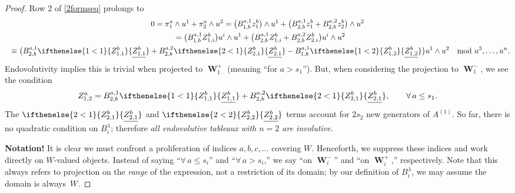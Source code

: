 \documentclass[11pt]{article}
\numberwithin{equation}{section}
\DeclareMathOperator{\Wu}{\mathbf{W}}
\newcommand{\Z}[3]{\ifthenelse{#1<#2}{\ensuremath{Z^{#3}_{#1,#2}}}{\ensuremath{\underline{Z^{#3}_{#1,#2}}}}}
\begin{document}
\begin{proof}
Row 2 of \eqref{2formseq} prolongs to
\begin{gather*}
0 = \pi^a_1 \wedge u^1 + \pi^a_2 \wedge u^2
  =
    \big( B^{a,1}_{1,b} z^b_1 \big)\wedge u^1
   +\big( B^{a,1}_{2,b} z^b_1
         + B^{a,2}_{2,b} z^b_2 \big)\wedge u^2\\
\hphantom{0}{} =
    \big( B^{a,1}_{1,b} Z^b_{1,i} \big)u^i\wedge u^1
   +\big( B^{a,1}_{2,b} Z^b_{1,i}
         + B^{a,2}_{2,b} Z^b_{2,i} \big)u^i\wedge u^2\\
\hphantom{0}{}
\equiv
    \big( B^{a,1}_{2,b} \Z{1}{1}{b}
         + B^{a,2}_{2,b} \Z{2}{1}{b}
         - B^{a,1}_{1,b} \Z{1}{2}{b}
         \big)u^1\wedge u^2 \ \mod u^3, \ldots, u^n.
\end{gather*}
Endovolutivity implies this is trivial when projected to $\Wu^+_1$ (meaning
``for $a > s_1$''). But, when considering the projection to $\Wu^-_1$, we see
the condition
\begin{gather*}
Z^a_{1,2} =  B^{a,1}_{2,b}\Z{1}{1}{b} +
B^{a,2}_{2,b}\Z{2}{1}{b},\qquad \forall\, a \leq s_1.
\end{gather*}
The $\Z{2}{1}{b}$ and $\Z{2}{2}{b}$ terms account for
$2s_2$ new generators of $A^{(1)}$.  So far, there is no quadratic condition on
$B^\lambda_i$; therefore \emph{all endovolutive tableaux with $n=2$ are
involutive.}

\textbf{Notation!}  It is clear we must confront a proliferation of indices
$a,b,c,\ldots$ covering $W$.  Henceforth, we suppress these indices and work
directly on $W$-valued objects.  Instead of saying ``$\forall\,
a\leq s_i$'' and ``$\forall\, a > s_i$,'' we say ``on $\Wu^-_i$'' and ``on
$\Wu^+_i$,'' respectively.  Note that this always refers to
projection on the \emph{range} of the expression, not a restriction of its
domain; by our def\/inition of $B^\lambda_i$, we may assume the domain is always~$W$.


\end{proof}
\end{document}
